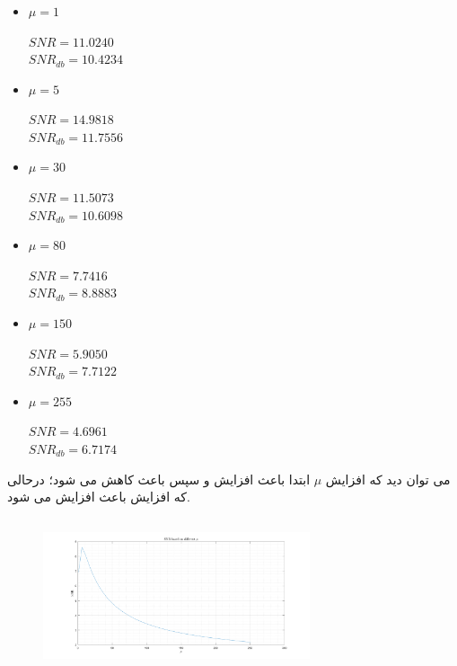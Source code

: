 \documentclass[a4paper]{article}
\begin{document}
\subsubsection{}
\begin{itemize}
	\item 
	$\mu = 1$
	\begin{flushleft}
		$SNR = 11.0240$\\
		$SNR_{db} = 10.4234$
	\end{flushleft}
	\item 
	$\mu = 5$
	\begin{flushleft}
		$SNR = 14.9818$\\
		$SNR_{db} = 11.7556$
	\end{flushleft}
	\item 
	$\mu = 30$
	\begin{flushleft}
		$SNR = 11.5073$\\
		$SNR_{db} = 10.6098$
	\end{flushleft}
	\item 
	$\mu = 80$
	\begin{flushleft}
		$SNR = 7.7416 $\\
		$SNR_{db} = 8.8883$
	\end{flushleft}
	\item 
	$\mu = 150$
	\begin{flushleft}
		$SNR = 5.9050$\\
		$SNR_{db} = 7.7122 $
	\end{flushleft}
	\item 
	$\mu = 255$
	\begin{flushleft}
		$SNR = 4.6961$\\
		$SNR_{db} = 6.7174$
	\end{flushleft}
\end{itemize}
می توان دید که افزایش 
$\mu$
ابتدا باعث افزایش و سپس باعث کاهش  می شود؛ درحالی که افزایش  باعث افزایش  می شود.
\subsection{}
\begin{figure}[H]
	\includegraphics[width=0.7\textwidth]{comsys_fig70.png}\\ 
	\centering
\end{figure}
\end{document}
